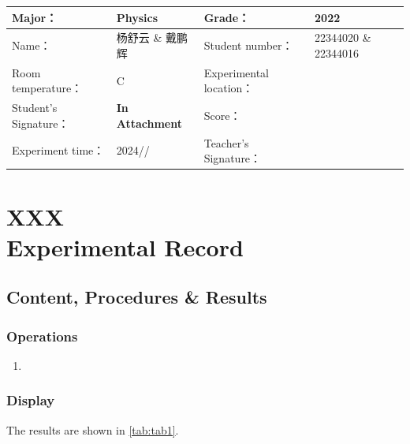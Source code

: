 
\begin{table}
	\renewcommand\arraystretch{1.7}
	\centering
	\begin{tabularx}{\textwidth}{|X|X|X|X|}
		\hline
		Major： & Physics & Grade： & 2022 \\
		\hline
		Name： & 杨舒云 \& 戴鹏辉 & Student number： & 22344020 \& 22344016\\
		\hline
		Room temperature： & \degree C & Experimental location： &  \\
		\hline
		Student's Signature：& \textbf{In Attachment} & Score： &\\
		\hline
		Experiment time：& 2024// & Teacher's Signature：&\\
		\hline
	\end{tabularx}
\end{table}
\section{XXX \\ Experimental Record}


\subsection{Content, Procedures \& Results}

\subsubsection{Operations}
\begin{enumerate}
	\item 
\end{enumerate}	

\subsubsection{Display}

The results are shown in \cref{tab:tab1}.

